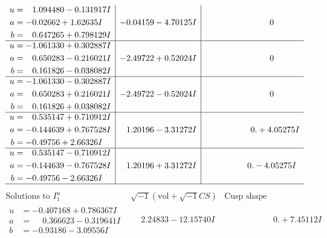 \documentclass[1p]{elsarticle_modified}
\theoremstyle{definition}
\newcommand{\I}{\sqrt{-1}}
\begin{document}
$$\begin{array}{c|c|c}
\begin{aligned}
u &= \phantom{-}1.094480 - 0.131917 I \\
a &= -0.02662 + 1.62635 I \\
b &= \phantom{-}0.647265 + 0.798129 I\end{aligned}
 & -0.04159 - 4.70125 I & \phantom{-0.000000 } 0 \\ \hline\begin{aligned}
u &= -1.061330 + 0.302887 I \\
a &= \phantom{-}0.650283 - 0.216021 I \\
b &= \phantom{-}0.161826 - 0.038082 I\end{aligned}
 & -2.49722 + 0.52024 I & \phantom{-0.000000 } 0 \\ \hline\begin{aligned}
u &= -1.061330 - 0.302887 I \\
a &= \phantom{-}0.650283 + 0.216021 I \\
b &= \phantom{-}0.161826 + 0.038082 I\end{aligned}
 & -2.49722 - 0.52024 I & \phantom{-0.000000 } 0 \\ \hline\begin{aligned}
u &= \phantom{-}0.535147 + 0.710912 I \\
a &= -0.144639 + 0.767528 I \\
b &= -0.49756 + 2.66326 I\end{aligned}
 & \phantom{-}1.20196 - 3.31272 I & \phantom{-0.000000 -}0. + 4.05275 I \\ \hline\begin{aligned}
u &= \phantom{-}0.535147 - 0.710912 I \\
a &= -0.144639 - 0.767528 I \\
b &= -0.49756 - 2.66326 I\end{aligned}
 & \phantom{-}1.20196 + 3.31272 I & \phantom{-0.000000 } 0. - 4.05275 I\\
 \hline 
 \end{array}$$\newpage$$\begin{array}{c|c|c}  
\text{Solutions to }I^u_{1}& \I (\text{vol} + \sqrt{-1}CS) & \text{Cusp shape}\\
 \hline 
\begin{aligned}
u &= -0.407168 + 0.786367 I \\
a &= \phantom{-}0.366623 - 0.319641 I \\
b &= -0.93186 - 3.09556 I\end{aligned}
 & \phantom{-}2.24833 - 12.15740 I & \phantom{-0.000000 -}0. + 7.45112 I \\ \hline\begin{aligned}

\end{aligned}
\end{array}$$
\end{document}
